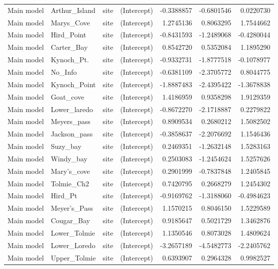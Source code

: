 \begin{longtable}
\begin{tabular}[t]{llllrrr}
Main model & Arthur_Island & site & (Intercept) & -0.3388857 & -0.6801546 & 0.0220730\\
Main model & Marys_Cove & site & (Intercept) & 1.2745136 & 0.8063295 & 1.7544662\\
Main model & Hird_Point & site & (Intercept) & -0.8431593 & -1.2489068 & -0.4280044\\
\addlinespace
Main model & Carter_Bay & site & (Intercept) & 0.8542720 & 0.5352084 & 1.1895290\\
Main model & Kynoch_Pt. & site & (Intercept) & -0.9332731 & -1.8777518 & -0.1078977\\
Main model & No_Info & site & (Intercept) & -0.6381109 & -2.3705772 & 0.8044775\\
Main model & Kynoch_Point & site & (Intercept) & -1.8887483 & -2.4395422 & -1.3678838\\
Main model & Goat_cove & site & (Intercept) & 1.4186959 & 0.9358298 & 1.9129359\\
\addlinespace
Main model & Lower_laredo & site & (Intercept) & -0.8672270 & -2.1718887 & 0.2279822\\
Main model & Meyers_pass & site & (Intercept) & 0.8909534 & 0.2680212 & 1.5082502\\
Main model & Jackson_pass & site & (Intercept) & -0.3858637 & -2.2076692 & 1.1546436\\
Main model & Suzy_bay & site & (Intercept) & 0.2469351 & -1.2632148 & 1.5283163\\
Main model & Windy_bay & site & (Intercept) & 0.2503083 & -1.2454624 & 1.5257626\\
\addlinespace
Main model & Mary's_cove & site & (Intercept) & 0.2901999 & -0.7837848 & 1.2405845\\
Main model & Tolmie_Ch2 & site & (Intercept) & 0.7420795 & 0.2668279 & 1.2454302\\
Main model & Hird_Pt & site & (Intercept) & -0.9169762 & -1.3188060 & -0.4984623\\
Main model & Meyer's_Pass & site & (Intercept) & 1.1570215 & 0.8046150 & 1.5229589\\
Main model & Cougar_Bay & site & (Intercept) & 0.9185647 & 0.5021729 & 1.3462876\\
\addlinespace
Main model & Lower_Tolmie & site & (Intercept) & 1.1350546 & 0.8073028 & 1.4809624\\
Main model & Lower_Loredo & site & (Intercept) & -3.2657189 & -4.5482773 & -2.2405762\\
Main model & Upper_Tolmie & site & (Intercept) & 0.6393907 & 0.2964328 & 0.9982527\\

\end{tabular}
\end{longtable}
